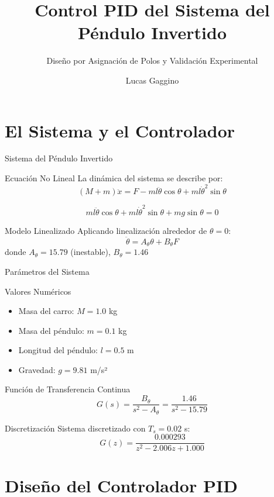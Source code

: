 \documentclass{beamer}
\title{Control PID del Sistema del Péndulo Invertido}
\subtitle{Diseño por Asignación de Polos y Validación Experimental}
\author{Lucas Gaggino}
\institute{Facultad de Ingeniería - UBA \\ Control Adaptativo 86.20}
\begin{document}
\begin{frame}
\titlepage
\end{frame}

\section{El Sistema y el Controlador}

\begin{frame}{Sistema del Péndulo Invertido}
\begin{block}{Ecuación No Lineal}
La dinámica del sistema se describe por:
\[
(M + m) \ddot{x} = F - m l \ddot{\theta} \cos\theta + m l \dot{\theta}^2 \sin\theta
\]

\[
m l \ddot{\theta} \cos\theta + m l \dot{\theta}^2 \sin\theta + m g \sin\theta = 0
\]
\end{block}

\begin{block}{Modelo Linealizado}
Aplicando linealización alrededor de $\theta = 0$:
\[
\ddot{\theta} = A_\theta \theta + B_\theta F
\]
donde $A_\theta = 15.79$ (inestable), $B_\theta = 1.46$
\end{block}
\end{frame}

\begin{frame}{Parámetros del Sistema}
\begin{block}{Valores Numéricos}
\begin{itemize}
\item Masa del carro: $M = 1.0$ kg
\item Masa del péndulo: $m = 0.1$ kg
\item Longitud del péndulo: $l = 0.5$ m
\item Gravedad: $g = 9.81$ m/s²
\end{itemize}
\end{block}

\begin{block}{Función de Transferencia Continua}
\[
G(s) = \frac{B_\theta}{s^2 - A_\theta} = \frac{1.46}{s^2 - 15.79}
\]
\end{block}

\begin{block}{Discretización}
Sistema discretizado con $T_s = 0.02$ s:
\[
G(z) = \frac{0.000293}{z^2 - 2.006z + 1.000}
\]
\end{block}
\end{frame}

\section{Diseño del Controlador PID}
\end{document}
